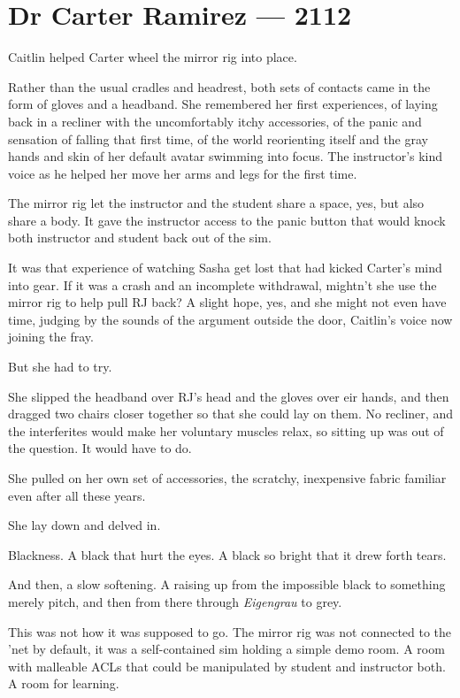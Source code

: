 \hypertarget{dr-carter-ramirez-2112}{%
\chapter*{Dr Carter Ramirez — 2112}\label{dr-carter-ramirez-2112}}

Caitlin helped Carter wheel the mirror rig into place.

Rather than the usual cradles and headrest, both sets of contacts came in the form of gloves and a headband. She remembered her first experiences, of laying back in a recliner with the uncomfortably itchy accessories, of the panic and sensation of falling that first time, of the world reorienting itself and the gray hands and skin of her default avatar swimming into focus. The instructor's kind voice as he helped her move her arms and legs for the first time.

The mirror rig let the instructor and the student share a space, yes, but also share a body. It gave the instructor access to the panic button that would knock both instructor and student back out of the sim.

It was that experience of watching Sasha get lost that had kicked Carter's mind into gear. If it was a crash and an incomplete withdrawal, mightn't she use the mirror rig to help pull RJ back? A slight hope, yes, and she might not even have time, judging by the sounds of the argument outside the door, Caitlin's voice now joining the fray.

But she had to try.

She slipped the headband over RJ's head and the gloves over eir hands, and then dragged two chairs closer together so that she could lay on them. No recliner, and the interferites would make her voluntary muscles relax, so sitting up was out of the question. It would have to do.

She pulled on her own set of accessories, the scratchy, inexpensive fabric familiar even after all these years.

She lay down and delved in.

Blackness. A black that hurt the eyes. A black so bright that it drew forth tears.

And then, a slow softening. A raising up from the impossible black to something merely pitch, and then from there through \emph{Eigengrau} to grey.

This was not how it was supposed to go. The mirror rig was not connected to the 'net by default, it was a self-contained sim holding a simple demo room. A room with malleable ACLs that could be manipulated by student and instructor both. A room for learning.

